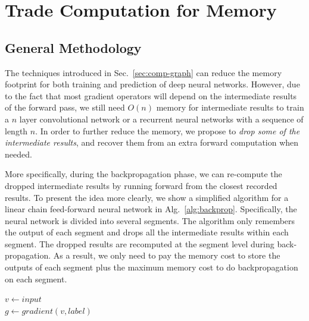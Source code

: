 \section{Trade Computation for Memory}

\subsection{General Methodology}

The techniques introduced in Sec.~\ref{sec:comp-graph} can reduce the memory footprint for both training and prediction of deep neural networks. However, due to the fact that most gradient operators will depend on the intermediate results of the forward pass, we still need $O(n)$ memory for intermediate results to train a $n$ layer convolutional network or a recurrent neural networks with a sequence of length $n$. In order to further reduce the memory, we propose to \emph{drop some of the intermediate results}, and recover them from an extra forward computation when needed.

More specifically, during the backpropagation phase, we can re-compute the dropped intermediate results by running forward from the closest recorded results. To present the idea more clearly, we show a simplified algorithm for a linear chain feed-forward neural network in Alg.~\ref{alg:backprop}.
Specifically, the neural network is divided into several segments. The algorithm only remembers the output of each segment and drops all the intermediate results within each segment. The dropped results are recomputed at the segment level during back-propagation. As a result, we only need to pay the memory cost to store the outputs of each segment plus the maximum memory cost to do backpropagation on each segment.

\begin{algorithm}[!t]
   \caption{Backpropagation with Data Dropping in a Linear Chain Network}\label{alg:backprop}
     $v \leftarrow input$\\
      $g \leftarrow gradient(v, label)$\\
\end{algorithm}

